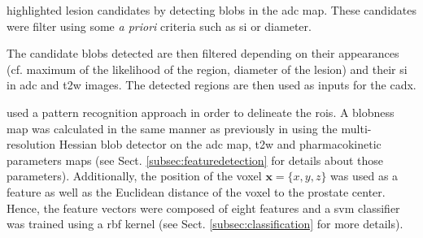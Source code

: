 \cite{Vos2012} highlighted lesion candidates by detecting blobs in the \ac{adc} map. These candidates were filter using some \textit{a priori} criteria such as \ac{si} or diameter.%
%
%
%

The candidate blobs detected are then filtered depending on their appearances (cf. maximum of the likelihood of the region, diameter of the lesion) and their \ac{si} in \ac{adc} and \ac{t2w} images. The detected regions are then used as inputs for the \ac{cadx}.

\cite{Litjens2011} used a pattern recognition approach in order to delineate the \acp{roi}. A blobness map was calculated in the same manner as previously in \cite{Vos2010} using the multi-resolution Hessian blob detector on the \ac{adc} map, \ac{t2w} and pharmacokinetic parameters maps (see Sect. \ref{subsec:featuredetection} for details about those parameters). Additionally, the position of the voxel $\mathbf{x}=\{x,y,z\}$ was used as a feature as well as the Euclidean distance of the voxel to the prostate center. Hence, the feature vectors were composed of eight features and a \ac{svm} classifier was trained using a \ac{rbf} kernel (see Sect. \ref{subsec:classification} for more details).

